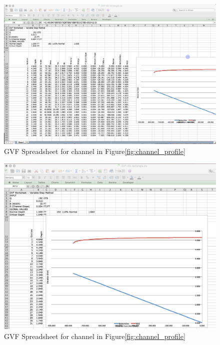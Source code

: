 \documentclass[12pt]{article}
\begin{document}
\begin{enumerate}
\begin{figure}[htbp] %
   \centering
   \includegraphics[width=6in]{GVF-UpperLeft.jpg} 
   \caption{GVF Spreadsheet for channel in Figure\ref{fig:channel_profile}}
   \label{fig:GVF-UpperLeft}
\end{figure}
\clearpage

\begin{figure}[htbp] %
   \centering
   \includegraphics[width=6in]{GVF-LowerLeft.jpg} 
   \caption{GVF Spreadsheet for channel in Figure\ref{fig:channel_profile}}
   \label{fig:GVF-LowerLeft}
\end{figure}



\end{enumerate}
\end{document}
